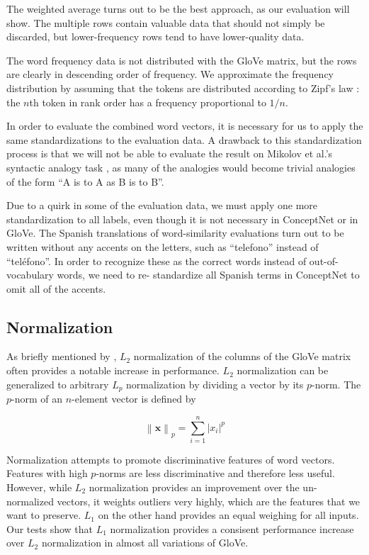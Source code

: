 \documentclass[letterpaper]{article}
\begin{document}
The weighted average turns out to be the best approach, as our evaluation will
show. The multiple rows contain valuable data that should not simply be
discarded, but lower-frequency rows tend to have lower-quality data.

The word frequency data is not distributed with the GloVe matrix, but
the rows are clearly in descending order of frequency. We approximate the
frequency distribution by assuming that the tokens are distributed according to
Zipf's law \cite{zipf1949human}: the $n$th token in rank order has a frequency
proportional to $1/n$.

In order to evaluate the combined word vectors, it is necessary for us to apply
the same standardizations to the evaluation data. A drawback to this
standardization process is that we will not be able to evaluate the result on
Mikolov et al.'s syntactic analogy task \cite{mikolov2013word2vec}, as many of
the analogies would become trivial analogies of the form
``A is to A as B is to B''.

Due to a quirk in some of the evaluation data, we must apply one more
standardization to all labels, even though it is not necessary in ConceptNet or
in GloVe. The Spanish translations of word-similarity evaluations
\cite{hassan2009crosslingual} turn out to be written without any accents on the
letters, such as ``telefono'' instead of ``tel\'{e}fono''. In order to recognize
these as the correct words instead of out-of-vocabulary words, we need to re-
standardize all Spanish terms in ConceptNet to omit all of the accents.


\subsection{Normalization}

As briefly mentioned by , $L_2$ normalization of
the columns of the GloVe matrix often provides a notable increase in
performance. $L_2$ normalization can be generalized to arbitrary
$L_p$ normalization by dividing a vector by its $p$-norm. The $p$-norm of an
$n$-element vector is defined by

$$ \left\|\mathbf{x}\right\|_p
  = \sum_{i=1}^n \left|x_i\right|^p$$

Normalization attempts to promote discriminative features of word vectors.
Features with high $p$-norms are less discriminative and therefore less useful.
However, while $L_2$ normalization provides an improvement over the un-normalized
vectors, it weights outliers very highly, which are the features that we want to
preserve. $L_1$ on the other hand provides an equal weighing for all inputs.
Our tests show that $L_1$ normalization provides a consisent performance
increase over $L_2$ normalization in almost all variations of GloVe.
\end{document}
